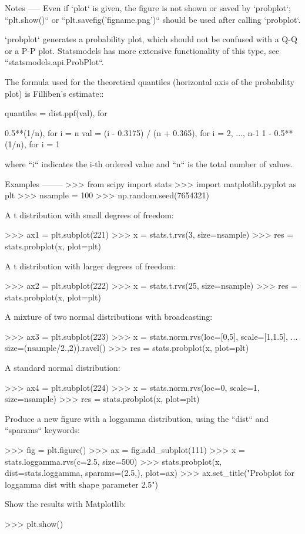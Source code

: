 \begin{DoxyVerb}
Notes
-----
Even if `plot` is given, the figure is not shown or saved by `probplot`;
``plt.show()`` or ``plt.savefig('figname.png')`` should be used after
calling `probplot`.

`probplot` generates a probability plot, which should not be confused with
a Q-Q or a P-P plot.  Statsmodels has more extensive functionality of this
type, see ``statsmodels.api.ProbPlot``.

The formula used for the theoretical quantiles (horizontal axis of the
probability plot) is Filliben's estimate::

    quantiles = dist.ppf(val), for

            0.5**(1/n),                  for i = n
      val = (i - 0.3175) / (n + 0.365),  for i = 2, ..., n-1
            1 - 0.5**(1/n),              for i = 1

where ``i`` indicates the i-th ordered value and ``n`` is the total number
of values.

Examples
--------
>>> from scipy import stats
>>> import matplotlib.pyplot as plt
>>> nsample = 100
>>> np.random.seed(7654321)

A t distribution with small degrees of freedom:

>>> ax1 = plt.subplot(221)
>>> x = stats.t.rvs(3, size=nsample)
>>> res = stats.probplot(x, plot=plt)

A t distribution with larger degrees of freedom:

>>> ax2 = plt.subplot(222)
>>> x = stats.t.rvs(25, size=nsample)
>>> res = stats.probplot(x, plot=plt)

A mixture of two normal distributions with broadcasting:

>>> ax3 = plt.subplot(223)
>>> x = stats.norm.rvs(loc=[0,5], scale=[1,1.5],
...                    size=(nsample/2.,2)).ravel()
>>> res = stats.probplot(x, plot=plt)

A standard normal distribution:

>>> ax4 = plt.subplot(224)
>>> x = stats.norm.rvs(loc=0, scale=1, size=nsample)
>>> res = stats.probplot(x, plot=plt)

Produce a new figure with a loggamma distribution, using the ``dist`` and
``sparams`` keywords:

>>> fig = plt.figure()
>>> ax = fig.add_subplot(111)
>>> x = stats.loggamma.rvs(c=2.5, size=500)
>>> stats.probplot(x, dist=stats.loggamma, sparams=(2.5,), plot=ax)
>>> ax.set_title("Probplot for loggamma dist with shape parameter 2.5")

Show the results with Matplotlib:

>>> plt.show()\end{DoxyVerb}
 \hypertarget{namespacescipy_1_1stats_1_1morestats_a7345bab19f49a0830910da93455ba6de}{}
